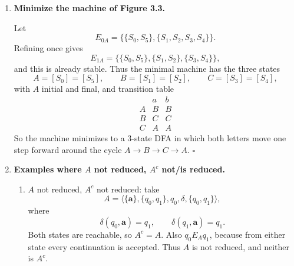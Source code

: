 \begin{enumerate}[{3.}1.]
\begin{enumerate}
\item Passing from nonempty $y$ with $|y|\leq i+1$ to strings of the form
$\mathbf{a}x$ with $\mathbf{a}\in\Sigma$ and $|x|\leq i$ uses the fact that
every nonempty string can be written uniquely in that form.

\item
\[
(\forall x\in\Sigma^* \ni |x|\leq i)(\DBAR(s,x)\in F \Leftrightarrow \DBAR(t,x)\in F)
\Leftrightarrow sE_{iA}t
\]
is the definition of $E_{iA}$.

\item
\[
\DBAR(s,\mathbf{a}x)=\DBAR(\delta(s,\mathbf{a}),x)
\]
and
\[
\DBAR(t,\mathbf{a}x)=\DBAR(\delta(t,\mathbf{a}),x)
\]
are both instances of the definition of the extended transition function
$\DBAR$.

\item Finally,
\[
(\forall x\in\Sigma^* \ni |x|\leq i)(\DBAR(\delta(s,\mathbf{a}),x)\in F
\Leftrightarrow \DBAR(\delta(t,\mathbf{a}),x)\in F)
\Leftrightarrow \delta(s,\mathbf{a})E_{iA}\delta(t,\mathbf{a})
\]
is again the definition of $E_{iA}$.
\end{enumerate}

\item \textbf{Minimize the machine of Figure 3.3.}

Let
\[
E_{0A}=\{\{S_0,S_5\},\{S_1,S_2,S_3,S_4\}\}.
\]
Refining once gives
\[
E_{1A}=\{\{S_0,S_5\},\{S_1,S_2\},\{S_3,S_4\}\},
\]
and this is already stable. Thus the minimal machine has the three states
\[
A=[S_0]=[S_5],\qquad B=[S_1]=[S_2],\qquad C=[S_3]=[S_4],
\]
with $A$ initial and final, and transition table
\[
\begin{array}{c|cc}
 & a & b\\\hline
A & B & B\\
B & C & C\\
C & A & A
\end{array}
\]
So the machine minimizes to a $3$-state DFA in which both letters move one step
forward around the cycle $A\to B\to C\to A$. $\square$

\item \textbf{Examples where $A$ not reduced, $A^c$ not/is reduced.}

\begin{enumerate}
\item $A$ not reduced, $A^c$ not reduced: take
\[
A=\langle\{\pmb{a}\},\{q_0,q_1\},q_0,\delta,\{q_0,q_1\}\rangle,
\]
where
\[
\delta(q_0,\pmb{a})=q_1,\qquad \delta(q_1,\pmb{a})=q_1.
\]
Both states are reachable, so $A^c=A$. Also $q_0 E_A q_1$, because from either
state every continuation is accepted. Thus $A$ is not reduced, and neither is
$A^c$.


\end{enumerate}
\end{enumerate}
